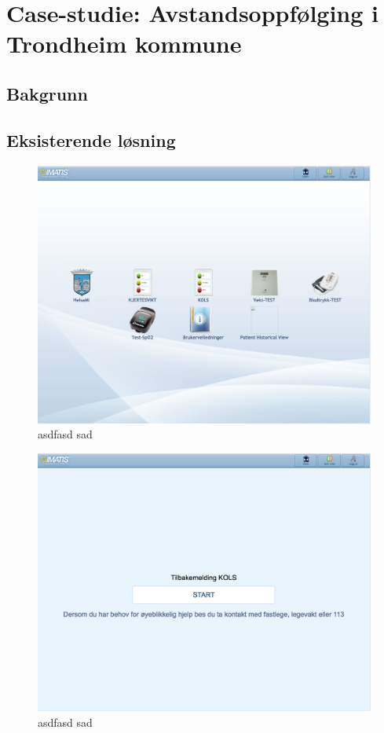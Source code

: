 \chapter{Case-studie: Avstandsoppfølging i Trondheim kommune}
\label{ch:case}

\section{Bakgrunn}
\blindtext

\section{Eksisterende løsning}
\blindtext

\begin{figure}
\includegraphics[width=1.0\textwidth,center]{fig/helsami/tk_1_start}
\caption{asdfasd sad}
\label{fig:helsami1}
\end{figure}

\begin{figure}
\includegraphics[width=1.0\textwidth,center]{fig/helsami/tk_2_kols}
\caption{asdfasd sad}
\label{fig:helsami1}
\end{figure}

